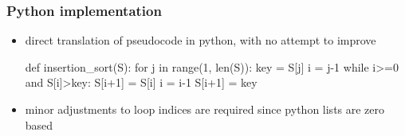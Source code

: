 \begin{frame}[fragile]
%
  \frametitle{Python implementation}
%
  \begin{itemize}
%
  \item direct translation of pseudocode in python, with no attempt to improve
%
  \begin{center}
    \begin{minipage}[h]{.75\linewidth}
      \begin{python}[%
        label={lst:insertion-sort:python},
        caption={Python implementation of insertion\_sort}
]
%
def insertion_sort(S):
    for j in range(1, len(S)):
        key = S[j]
        i = j-1
        while i>=0 and S[i]>key:
            S[i+1] = S[i]
            i = i-1
        S[i+1] = key
      \end{python}
    \end{minipage}
  \end{center}
%
  \item minor adjustments to loop indices are required since python lists are zero based
  \end{itemize}
%
\end{frame}

